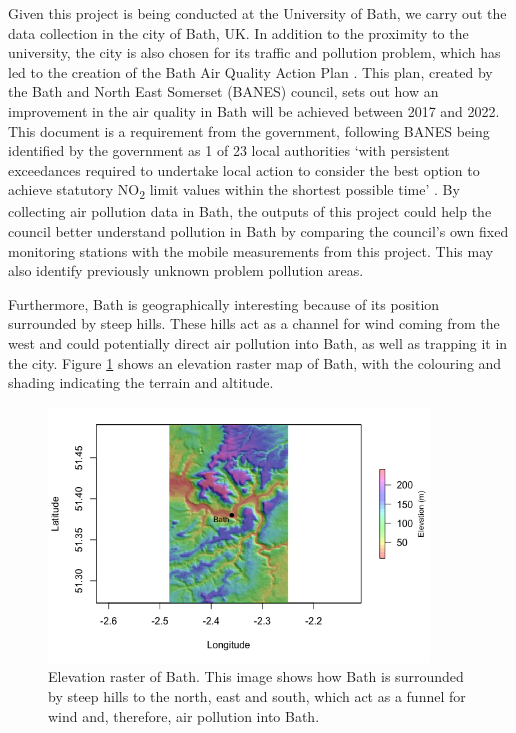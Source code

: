\documentclass[11pt]{report}
\begin{document}
Given this project is being conducted at the University of Bath, we carry out the data collection in the city of Bath, UK. In addition to the proximity to the university, the city is also chosen for its traffic and pollution problem, which has led to the creation of the Bath Air Quality Action Plan \citep{BANES2017baqap}. This plan, created by the Bath and North East Somerset (BANES) council, sets out how an improvement in the air quality in Bath will be achieved between 2017 and 2022. This document is a requirement from the government, following BANES being identified by the government as 1 of 23 local authorities `with persistent exceedances required to undertake local action to consider the best option to achieve statutory NO\textsubscript{2} limit values within the shortest possible time' \citep{DEFRA2017uknoxplan}. By collecting air pollution data in Bath, the outputs of this project could help the council better understand pollution in Bath by comparing the council's own fixed monitoring stations with the mobile measurements from this project. This may also identify previously unknown problem pollution areas.


Furthermore, Bath is geographically interesting because of its position surrounded by steep hills. These hills act as a channel for wind coming from the west and could potentially direct air pollution into Bath, as well as trapping it in the city. Figure \ref{bath_elevation} shows an elevation raster map of Bath, with the colouring and shading indicating the terrain and altitude.

\begin{figure}[!htb]
\centering
\includegraphics[width=0.9\textwidth]{images/bath_elevation_large}
\caption[Elevation raster of Bath.]{Elevation raster of Bath. This image shows how Bath is surrounded by steep hills to the north, east and south, which act as a funnel for wind and, therefore, air pollution into Bath.}
\label{bath_elevation}
\end{figure}
\end{document}
